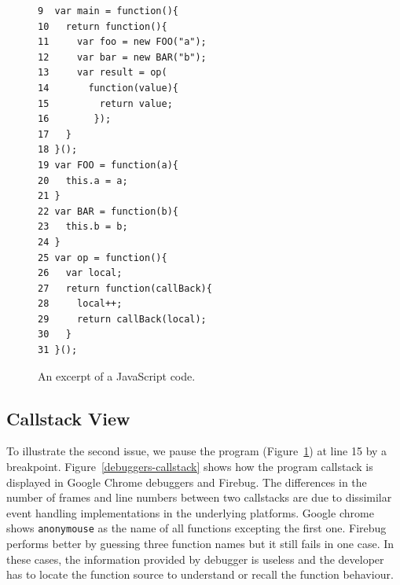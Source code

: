 \documentclass[conference]{IEEEtran}
\begin{document}
\begin{figure}[!t]
{\small 
\begin{verbatim}
9  var main = function(){
10   return function(){
11     var foo = new FOO("a");
12     var bar = new BAR("b");
13     var result = op(
14       function(value){
15         return value;
16        });
17   }
18 }();
19 var FOO = function(a){
20   this.a = a;
21 }
22 var BAR = function(b){
23   this.b = b;
24 }
25 var op = function(){
26   var local;
27   return function(callBack){
28     local++;
29     return callBack(local);
30   }
31 }();
\end{verbatim}}
\caption{An excerpt of a JavaScript code.}
\label{js-code}
\end{figure}

\subsection{Callstack View}
To illustrate the second issue, we pause the program (Figure~\ref{js-code}) at line 15 by a breakpoint. Figure~\ref{debuggers-callstack} shows how the program callstack is displayed in Google Chrome debuggers and Firebug. The differences in the number of frames and line numbers between two callstacks are due to dissimilar event handling implementations in the underlying platforms. Google chrome shows {\small\texttt{anonymouse}} as the name of all functions excepting the first one. Firebug performs better by guessing three function names but it still fails in one case. In these cases, the information provided by debugger is useless and the developer has to locate the function source to understand or recall the function behaviour. 
\end{document}
